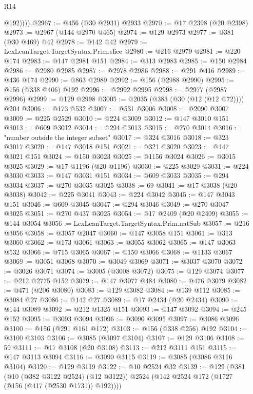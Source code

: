 \begin{lexlean}{R14}
\begin{coremodule}
            @192))))
@2967 := @456 (@30 @2931) @2933
@2970 := @17 @2398 (@20 @2398)
@2973 := @2967 (@144 @2970 @465)
@2974 := @129 @2973
@2977 := @381 (@30 @469) @42
@2978 := @142 @42
@2979 := LexLeanTarget.TargetSyntax.Prim.slice
@2980 := @216 @2979
@2981 := @220 @174
@2983 := @147 @2981 @151
@2984 := @313 @2983
@2985 := @150 @2984
@2986 := @2980 @2985
@2987 := @2978 @2986
@2988 := @291 @416
@2989 := @436 @174
@2990 := @863 @2989
@2992 := @156 (@2988 @2990)
@2995 := @156 (@338 @406) @192
@2996 := @2992 @2995
@2998 := @2977 (@2987 @2996)
@2999 := @129 @2998
@3005 := @2035 (@383 (@30 (@12 (@12 @72)))) @204
@3006 := @173 @532
@3007 := @531 @3006
@3008 := @2090 @3007
@3009 := @225 @2529
@3010 := @224 @3009
@3012 := @147 @3010 @151
@3013 := @609 @3012
@3014 := @294 @3013
@3015 := @270 @3014
@3016 := "number outside the integer subset"
@3017 := @324 @3016
@3018 := @323 @3017
@3020 := @147 @3018 @151
@3021 := @321 @3020
@3023 := @147 @3021 @151
@3024 := @150 @3023
@3025 := @1156 @3024
@3026 := @3015 @3025
@3029 := @17 @1196 (@20 @1196)
@3030 := @225 @3029
@3031 := @224 @3030
@3033 := @147 @3031 @151
@3034 := @609 @3033
@3035 := @294 @3034
@3037 := @270 @3035 @3025
@3038 := 69
@3041 := @17 @3038 (@20 @3038)
@3042 := @225 @3041
@3043 := @224 @3042
@3045 := @147 @3043 @151
@3046 := @609 @3045
@3047 := @294 @3046
@3049 := @270 @3047 @3025
@3051 := @270 @437 @3025
@3054 := @17 @2409 (@20 @2409)
@3055 := @144 @3054
@3056 := LexLeanTarget.TargetSyntax.Prim.natSub
@3057 := @216 @3056
@3058 := @3057 @2047
@3060 := @147 @3058 @151
@3061 := @313 @3060
@3062 := @173 @3061
@3063 := @3055 @3062
@3065 := @147 @3063 @532
@3066 := @715 @3065
@3067 := @150 @3066
@3068 := @1133 @3067
@3069 := @3051 @3068
@3070 := @3049 @3069
@3071 := @3037 @3070
@3072 := @3026 @3071
@3074 := @3005 (@3008 @3072)
@3075 := @129 @3074
@3077 := @212 @2775 @152
@3079 := @147 @3077 @484
@3080 := @476 @3079
@3082 := @471 (@206 @3080)
@3083 := @129 @3082
@3084 := @139 @112
@3085 := @3084 @27
@3086 := @142 @27
@3089 := @17 @2434 (@20 @2434)
@3090 := @144 @3089
@3092 := @212 @1325 @151
@3093 := @147 @3092
@3094 := @245 @152
@3095 := @3093 @3094
@3096 := @3090 @3095
@3097 := @3086 @3096
@3100 := @156 (@291 @161 @172)
@3103 := @156 (@338 @256) @192
@3104 := @3100 @3103
@3106 := @3085 (@3097 @3104)
@3107 := @129 @3106
@3108 := 59
@3111 := @17 @3108 (@20 @3108)
@3113 := @212 @3111 @151
@3115 := @147 @3113 @3094
@3116 := @3090 @3115
@3119 := @3085 (@3086 @3116 @3104)
@3120 := @129 @3119
@3122 := @10 @2524 @32
@3139 := @129
    (@381
      (@10 (@382 @3122 @2524) (@12 @3122))
      @2524
      (@142 @2524 @172 (@1727 (@156 (@417 (@2530 @1731)) @192))))

\end{coremodule}
\end{lexlean}
